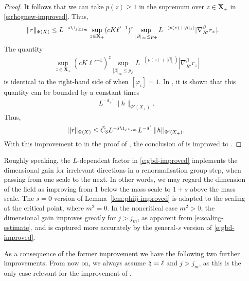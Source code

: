 \begin{proof}
It follows that we can take $p(z) \geq 1$ in the supremum over $z \in \mathbf{X}_+$ in
\eqref{e:rhognew-improved}. Thus,
\begin{align}
    \|r\|_{\Phi (X)}
    & \le
    L^{-s \1_{{j\geq j_m}}}
    \sup_{z \in {\mathbf X}_+}
    (cK\ell'^{-1})^z
    \sup_{|\beta|_\infty \le p_\Phi}
    L^{-(p(z) +|\beta|_1)}
    | \nabla_{R'}^\beta  r_{z}  |.
\end{align}
The quantity
\begin{align}
\label{e:rhognew}
    \sup_{z \in {\mathbf X}_+}
    (cK\ell'^{-1})^z
    \sup_{|\beta|_\infty \le p_\Phi}
    L^{-(p(z) +|\beta|_1)}
    | \nabla_{R'}^\beta  r_{z}  |
\end{align}
is identical to the right-hand side of \cite[\eqref{loc-e:rhognew}]{BS-rg-loc} when $[\varphi_i] = 1$. In \cite{BS-rg-loc}, it is shown that this quantity can be bounded by a constant times
\begin{align}
    L^{-d_{+}'}
    \|h\|_{\Phi'( X_+)}.
\end{align}
Thus,
\begin{equation}
    \|r\|_{\Phi (X)}
    \leq \bar C_3
    L^{-s \1_{{j\geq j_m}}}
    L^{-d_{+}'}
    \|h\|_{\Phi'( X_+)}.
\end{equation}
With this improvement to \cite[\eqref{loc-e:rhognew}]{BS-rg-loc} in the proof of
\cite[Lemma~\ref{loc-lem:phij}]{BS-rg-loc}, the conclusion of
\cite[Lemma~\ref{loc-lem:phij}]{BS-rg-loc} is improved to .
\end{proof}

Roughly speaking, the $L$-dependent factor in \eqref{e:gbd-improved} implements the dimensional gain
for irrelevant directions in a renormalisation group step, when passing from one scale to the next.
In other words, we may regard the dimension of the field as improving from $1$ below the
mass scale to $1+s$ above the mass scale.
The $s=0$ version of Lemma~\ref{lem:phiij-improved} is adapted to the scaling at the critical point, where $m^2=0$.
In the noncritical case $m^2>0$, the dimensional gain improves greatly for $j>j_m$,
as apparent from \eqref{e:scaling-estimate}, and is
captured more accurately by the general-$s$ version of \eqref{e:gbd-improved}.

As a consequence of the former improvement we have the following two further improvements.
From now on, we always assume $\mathfrak{h}=\ell$ and $j>j_m$, as this is the only case relevant for
the improvement of \cite[Proposition~\ref{IE-prop:cl}]{BS-rg-IE}.

